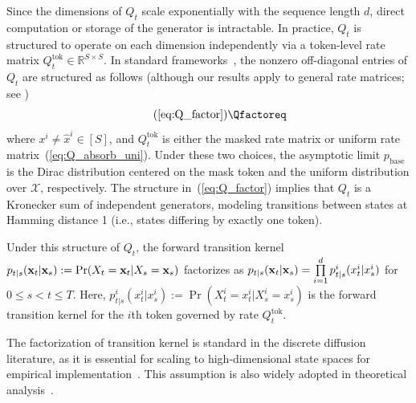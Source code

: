 \documentclass{article} %
\def\eqref#1{equation~\ref{#1}}
\newcommand{\bfx}{{\bf x}}
\renewcommand{\eqref}[1]{\textup{(\ref{#1})}}
\begin{document}
Since the dimensions of $Q_t$ scale exponentially with the sequence length $d$, direct computation or storage of the generator is intractable. In practice, $Q_t$ is structured to operate on each dimension independently via a token-level rate matrix $Q_t^\mathrm{tok} \in \mathbb{R}^{S \times S}$. In standard frameworks~\citep{campbell2022continuous,lou2024discrete,zhang2025convergence}, the nonzero off-diagonal entries of $Q_t$ are structured as follows (although our results apply to general rate matrices; see )
\begin{equation}\tag{\ref*{eq:Q_factor}}
    \Qfactoreq
\end{equation}
where $x^i \neq \hat{x}^i \in [S]$, and $Q_t^\mathrm{tok}$ is either the masked rate matrix or uniform rate matrix~\eqref{eq:Q_absorb_uni}. Under these two choices, the asymptotic limit $p_{\mathrm{base}}$ is the Dirac distribution centered on the mask token and the uniform distribution over $\mathcal{X}$, respectively.
The structure in~\eqref{eq:Q_factor} implies that $Q_t$ is a Kronecker sum of independent generators, modeling transitions between states at Hamming distance 1 (i.e., states differing by exactly one token).

Under this structure of $Q_t$, the forward transition kernel $p_{t|s}(\bfx_t|\bfx_s):=\Pr(X_t=\bfx_t| X_s=\bfx_s)$ factorizes as $p_{t|s}(\bfx_t|\bfx_s)=\prod\limits_{i=1}^d p^i_{t|s}(x_t^i|x_s^i)$ for $0 \leq s < t \leq T$. Here, $p^i_{t|s}(x_t^i|x_s^i):=\Pr(X_t^i=x_t^i|X_s^i=x_s^i)$ is the forward transition kernel for the $i$th token governed by rate $Q_t^\mathrm{tok}$.

The factorization of transition kernel is standard in the discrete diffusion literature, as it is essential for scaling to high-dimensional state spaces for empirical implementation~\cite{austin2021structured,campbell2022continuous,campbell2024generative,lou2024discrete}. This assumption is also widely adopted in theoretical analysis~\cite{zhao2025unified,chen2025convergence,zhang2025convergence,ren2025discrete}. 
\end{document}
